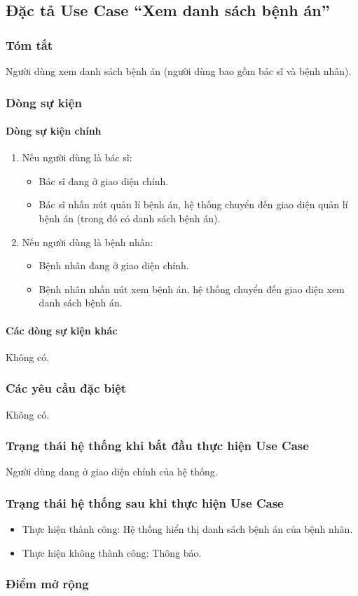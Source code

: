 \subsection{Đặc tả Use Case ``Xem danh sách bệnh án''}

\subsubsection{Tóm tắt}
Người dùng xem danh sách bệnh án (người dùng bao gồm bác sĩ và bệnh nhân).

\subsubsection{Dòng sự kiện}
\paragraph{\textbf{Dòng sự kiện chính}}
\begin{enumerate}
  \item Nếu người dùng là bác sĩ:
    \begin{itemize}
      \item Bác sĩ đang ở giao diện chính.
      \item Bác sĩ nhấn nút quản lí bệnh án, hệ thống chuyển đến giao diện quản lí bệnh án (trong đó có danh sách bệnh án).
    \end{itemize}
  \item Nếu người dùng là bệnh nhân:
    \begin{itemize}
      \item Bệnh nhân đang ở giao diện chính.
      \item Bệnh nhân nhấn nút xem bệnh án, hệ thống chuyển đến giao diện xem danh sách bệnh án.
    \end{itemize}
\end{enumerate}

\paragraph{\textbf{Các dòng sự kiện khác}}
Không có.

\subsubsection{Các yêu cầu đặc biệt}
Không có.

\subsubsection{Trạng thái hệ thống khi bắt đầu thực hiện Use Case}
Người dùng dang ở giao diện chính của hệ thống.

\subsubsection{Trạng thái hệ thống sau khi thực hiện Use Case}
\begin{itemize}
  \item Thực hiện thành công: Hệ thống hiển thị danh sách bệnh án của bệnh nhân.
  \item Thực hiện không thành công: Thông báo.
\end{itemize}

\subsubsection{Điểm mở rộng}